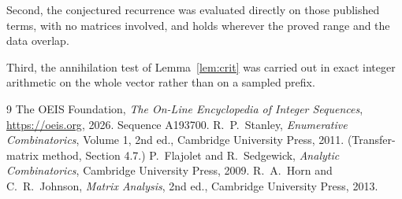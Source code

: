 \documentclass[11pt,a4paper]{article}
\theoremstyle{plain}
\theoremstyle{definition}
\begin{document}
Second, the conjectured recurrence was evaluated directly on those published terms, with no
matrices involved, and holds wherever the proved range and the data overlap.

Third, the annihilation test of Lemma~\ref{lem:crit} was carried out in exact integer
arithmetic on the whole vector rather than on a sampled prefix.

\begin{thebibliography}{9}
 The OEIS Foundation, \emph{The On-Line Encyclopedia of Integer
Sequences}, \url{https://oeis.org}, 2026. Sequence A193700.
 R.~P.~Stanley, \emph{Enumerative Combinatorics}, Volume 1, 2nd ed.,
Cambridge University Press, 2011. (Transfer-matrix method, Section 4.7.)
 P.~Flajolet and R.~Sedgewick, \emph{Analytic Combinatorics}, Cambridge
University Press, 2009.
 R.~A.~Horn and C.~R.~Johnson, \emph{Matrix Analysis}, 2nd ed., Cambridge
University Press, 2013.
\end{thebibliography}
\end{document}
